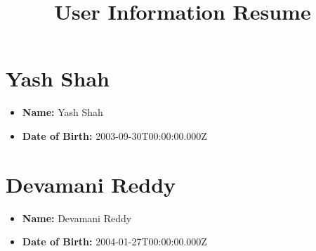 \documentclass[a4paper,10pt]{article}
\begin{document}
  
  \title{User Information Resume}
  \author{}
  \date{}
  \maketitle
  
  
  \section*{Yash Shah}
  \begin{itemize}[leftmargin=*]
    \item \textbf{Name:} Yash Shah
    \item \textbf{Date of Birth:} 2003-09-30T00:00:00.000Z
  \end{itemize}
  
  \section*{Devamani Reddy}
  \begin{itemize}[leftmargin=*]
    \item \textbf{Name:} Devamani Reddy
    \item \textbf{Date of Birth:} 2004-01-27T00:00:00.000Z
  \end{itemize}
  
  
\end{document}
